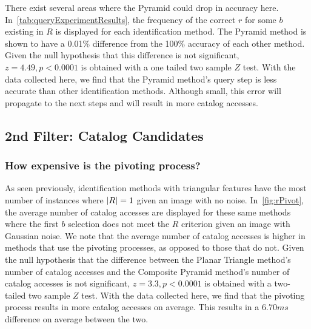 There exist several areas where the Pyramid could drop in accuracy here.
In~\autoref{tab:queryExperimentResults}, the frequency of the correct $r$ for some $b$ existing in $R$ is displayed
for each identification method.
The Pyramid method is shown to have a 0.01\% difference from the 100\% accuracy of each other method.
Given the null hypothesis that this difference is not significant, $z= 4.49, p < 0.0001$ is obtained with a one tailed
two sample $Z$ test.
With the data collected here, we find that the Pyramid method's query step is less accurate than other identification
methods.
Although small, this error will propagate to the next steps and will result in more catalog accesses.

\subsection{2nd Filter: Catalog Candidates}\label{subsec:2ndFilter:CatalogCandidates}
\begin{figure}
\end{figure}

\subsubsection{How expensive is the pivoting process?}
As seen previously, identification methods with triangular features have the most number of instances where
$\left| R \right| = 1$ given an image with no noise.
In~\autoref{fig:rPivot}, the average number of catalog accesses are displayed for these same methods where the first
$b$ selection does not meet the $R$ criterion given an image with Gaussian noise.
We note that the average number of catalog accesses is higher in methods that use the pivoting processes,
as opposed to those that do not.
Given the null hypothesis that the difference between the Planar Triangle method's number of catalog accesses and
the Composite Pyramid method's number of catalog accesses is not significant, $z = 3.3, p < 0.0001$ is
obtained with a two-tailed two sample $Z$ test.
With the data collected here, we find that the pivoting process results in more catalog accesses on average.
This results in a $6.70\si{ms}$ difference on average between the two.

